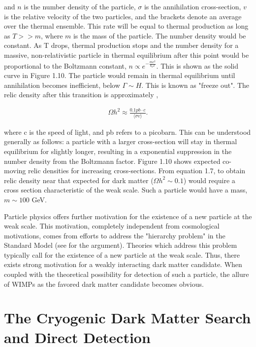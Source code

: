 \documentclass{report}
\begin{document}
and $n$ is the number density of the particle, $\sigma$ is the annihilation cross-section, $v$ is the relative velocity of the two particles, and the brackets denote an average over the thermal ensemble. This rate will be equal to thermal production as long as $T >> m$, where $m$ is the mass of the particle. The number density would be constant. As T drops, thermal production stops and the number density for a massive, non-relativistic particle in thermal equilibrium after this point would be proportional to the Boltzmann constant, $n \propto e^{-\frac{mc^2}{k_bT}}$. This is shown as the solid curve in Figure 1.10. The particle would remain in thermal equilibrium until annihilation becomes inefficient, below $\Gamma \sim H$. This is known as "freeze out". The relic density after this transition is approximately \cite{Jungman1996},

\begin{eqnarray}
\Omega h^2 \approx \frac{0.1pb \cdot c}{\langle \sigma v \rangle} .
\end{eqnarray}

where c is the speed of light, and pb refers to a picobarn. This can be understood generally as follows: a particle with a larger cross-section will stay in thermal equilibrium for slightly longer, resulting in a exponential suppression in the number density from the Boltzmann factor. Figure 1.10 shows expected co-moving relic densities for increasing cross-sections. From equation 1.7, to obtain relic density near that expected for dark matter ($\Omega h^2 \sim 0.1$) would require a cross section characteristic of the weak scale. Such a particle would have a mass, $m \sim 100 $ GeV.

Particle physics offers further motivation for the existence of a new particle at the weak scale. This motivation, completely independent from cosmological motivations, comes from efforts to address the "hierarchy problem" in the Standard Model (see \cite{Filippini2008} for the argument). Theories which address this problem typically call for the existence of a new particle at the weak scale. Thus, there exists strong motivation for a weakly interacting dark matter candidate. When coupled with the theoretical possibility for detection of such a particle, the allure of WIMPs as the favored dark matter candidate becomes obvious.

\section{The Cryogenic Dark Matter Search and Direct Detection}
\end{document}
